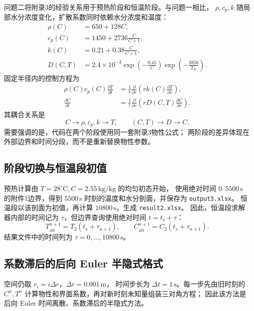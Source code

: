 \documentclass[UTF8,a4paper,11pt]{ctexart}
\numberwithin{equation}{section}
\begin{document}
问题二将附录3的经验关系用于预热阶段和恒温阶段。与问题一相比，
\(\rho,c_p,k\) 随局部水分浓度变化，扩散系数同时依赖水分浓度和温度：
\begin{align}
\rho(C)&=650+128C, \label{eq:q2-rho}\\
c_p(C)&=1450+2736\frac{C}{C+1}, \label{eq:q2-cp}\\
k(C)&=0.21+0.38\frac{C}{C+1}, \label{eq:q2-k}\\
D(C,T)&=2.4\times10^{-3}\exp\left(-\frac{0.45}{C}\right)
\exp\left(-\frac{3850}{T_K}\right). \label{eq:q2-D}
\end{align}
固定半径内的控制方程为
\begin{align}
\rho(C)c_p(C)\frac{\partial T}{\partial t}
&=\frac{1}{r}\frac{\partial}{\partial r}
\left(rk(C)\frac{\partial T}{\partial r}\right), \label{eq:q2-T}\\
\frac{\partial C}{\partial t}
&=\frac{1}{r}\frac{\partial}{\partial r}
\left(rD(C,T)\frac{\partial C}{\partial r}\right). \label{eq:q2-C}
\end{align}
其耦合关系是
\[
C\longrightarrow \rho,c_p,k\longrightarrow T,\qquad
(C,T)\longrightarrow D\longrightarrow C.
\]
需要强调的是，代码在两个阶段使用同一套附录3物性公式；
两阶段的差异体现在外部边界和时间分段，而不是重新替换物性参数。

\subsection{阶段切换与恒温段初值}

预热计算由 \(T=28^\circ\mathrm{C},C=2.55\,\mathrm{kg/kg}\) 的均匀初态开始，
使用绝对时间 \(0\)--\(5500\,\mathrm{s}\) 的附件1边界，得到 \(5500\,\mathrm{s}\)
时刻的温度和水分剖面，并保存为 \texttt{output3.xlsx}。
恒温段以该剖面为初值，再计算 \(10800\,\mathrm{s}\)，生成 \texttt{result2.xlsx}。
因此，恒温段求解器内部的时间记为 \(\tau\)，但边界查询使用绝对时间
\(t=t_s+\tau\)：
\[
T_{\mathrm{air}}^{n+1}=T_2(t_s+\tau_{n+1}),\qquad
C_{\mathrm{air}}^{n+1}=C_2(t_s+\tau_{n+1}).
\]
结果文件中的时间列为 \(\tau=0,\ldots,10800\,\mathrm{s}\)。

\subsection{系数滞后的后向 Euler 半隐式格式}

空间仍取 \(r_i=i\Delta r\)，\(\Delta r=0.001\,\mathrm{m}\)，
时间步长为 \(\Delta t=1\,\mathrm{s}\)。每一步先由旧时刻的
\(C^n,T^n\) 计算物性和界面系数，再对新时刻未知量组装三对角方程；
因此该方法是后向 Euler 时间离散、系数滞后的半隐式方法。
\end{document}
